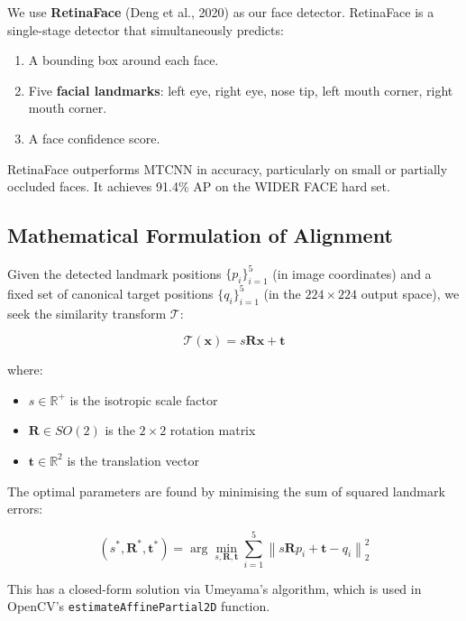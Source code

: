 \documentclass[12pt,a4paper]{article}
\begin{document}
We use \textbf{RetinaFace} (Deng et al., 2020) as our face detector. RetinaFace is a
single-stage detector that simultaneously predicts:

\begin{enumerate}[leftmargin=1.5em]
  \item A bounding box around each face.
  \item Five \textbf{facial landmarks}: left eye, right eye, nose tip, left mouth corner,
    right mouth corner.
  \item A face confidence score.
\end{enumerate}

RetinaFace outperforms MTCNN in accuracy, particularly on small or partially occluded
faces. It achieves 91.4\% AP on the WIDER FACE hard set.

\subsection{Mathematical Formulation of Alignment}

Given the detected landmark positions $\{p_i\}_{i=1}^{5}$ (in image coordinates) and
a fixed set of canonical target positions $\{q_i\}_{i=1}^{5}$ (in the $224 \times 224$
output space), we seek the similarity transform $\mathcal{T}$:

\begin{equation}
  \mathcal{T}(\mathbf{x}) = s \mathbf{R} \mathbf{x} + \mathbf{t}
\end{equation}

where:
\begin{itemize}[leftmargin=1.5em]
  \item $s \in \mathbb{R}^+$ is the isotropic scale factor
  \item $\mathbf{R} \in SO(2)$ is the $2\!\times\!2$ rotation matrix
  \item $\mathbf{t} \in \mathbb{R}^2$ is the translation vector
\end{itemize}

The optimal parameters are found by minimising the sum of squared landmark errors:

\begin{equation}
  (s^*, \mathbf{R}^*, \mathbf{t}^*) = \arg\min_{s, \mathbf{R}, \mathbf{t}}
  \sum_{i=1}^{5} \left\| s \mathbf{R} p_i + \mathbf{t} - q_i \right\|_2^2
\end{equation}

This has a closed-form solution via Umeyama's algorithm, which is used in OpenCV's
\texttt{estimateAffinePartial2D} function.
\end{document}

